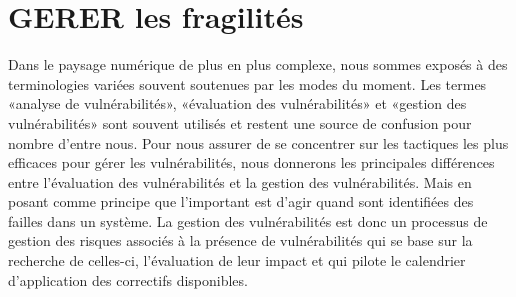 \uchap{\jobname}

\section{GERER les fragilités}

\label{chap:GESTVUL}

Dans le paysage numérique de plus en plus complexe, nous sommes exposés à des terminologies variées souvent soutenues par les modes du moment. Les termes «analyse de vulnérabilités», «évaluation des vulnérabilités» et «gestion des vulnérabilités» sont souvent utilisés et restent une source de confusion pour nombre d’entre nous. Pour nous assurer de se concentrer sur les tactiques les plus efficaces pour gérer les vulnérabilités, nous donnerons les principales différences entre l’évaluation des vulnérabilités et la gestion des vulnérabilités. Mais en posant comme principe que l'important est d'agir quand sont identifiées des failles dans un système.
 La gestion des vulnérabilités est donc un processus de gestion des risques associés à la présence de vulnérabilités qui se base sur la recherche de celles-ci, l'évaluation de leur impact et qui pilote le calendrier d’application des correctifs disponibles.

